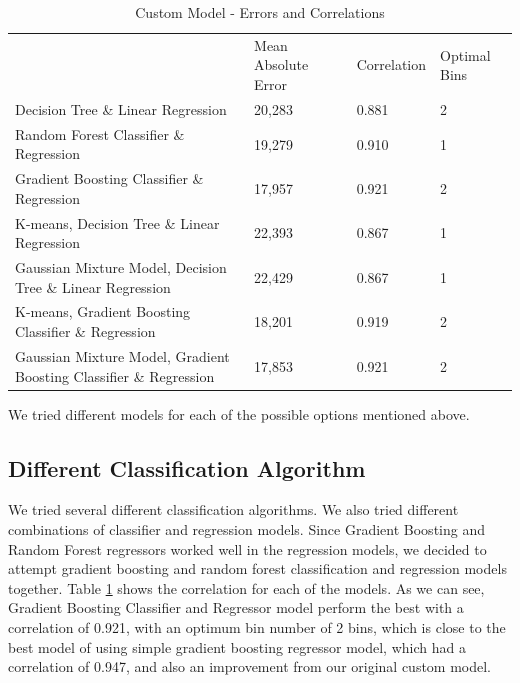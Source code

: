 \documentclass[conference,compsoc]{IEEEtran}
\begin{document}
\begin{table}[!htbp]
\centering
\caption{Custom Model - Errors and Correlations}
\label{table:custommodperf}
\begin{tabular}{llll}
                                                                   & Mean Absolute Error & Correlation & Optimal Bins\\
Decision Tree \& Linear Regression                                 & 20,283              & 0.881       & 2\\
Random Forest Classifier \& Regression                             & 19,279              & 0.910       & 1\\
Gradient Boosting Classifier \& Regression                         & 17,957              & 0.921       & 2\\
K-means, Decision Tree \& Linear Regression                        & 22,393              & 0.867       & 1\\
Gaussian Mixture Model, Decision Tree \& Linear Regression         & 22,429              & 0.867       & 1\\
K-means, Gradient Boosting Classifier \& Regression                & 18,201              & 0.919       & 2\\
Gaussian Mixture Model, Gradient Boosting Classifier \& Regression & 17,853              & 0.921       & 2
\end{tabular}
\end{table}




We tried different models for each of the possible options mentioned above.

\subsection {Different Classification Algorithm}
We tried several different classification algorithms. We also tried different combinations of classifier and regression models. Since Gradient Boosting and Random Forest regressors worked well in the regression models, we decided to attempt gradient boosting and random forest classification and regression models together. Table \ref{table:custommodperf} shows the correlation for each of the models.
As we can see, Gradient Boosting Classifier and Regressor model perform the best with a correlation of 0.921, with an optimum bin number of 2 bins, which is close to the best model of using simple gradient boosting regressor model, which had a correlation of 0.947, and also an improvement from our original custom model. 
\end{document}
